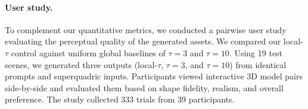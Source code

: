 \paragraph{User study.}

To complement our quantitative metrics, we conducted a pairwise user study evaluating the perceptual quality of the generated assets. We compared our local-$\tau$ control against uniform global baselines of $\tau = 3$ and $\tau = 10$. Using 19 test scenes, we generated three outputs (local-$\tau$, $\tau=3$, and $\tau=10$) from identical prompts and superquadric inputs. Participants viewed interactive 3D model pairs side-by-side and evaluated them based on shape fidelity, realism, and overall preference. The study collected 333 trials from 39 participants.




